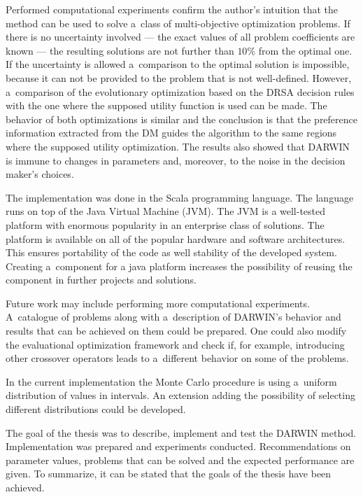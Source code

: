 Performed computational experiments confirm the author's intuition that the
method can be used to solve a~class of multi-objective optimization
problems. If there is no uncertainty involved --- the exact values of all
problem coefficients are known --- the resulting solutions are not further
than $10\%$ from the optimal one. If the uncertainty is allowed a~comparison
to the optimal solution is impossible, because it can not be provided to the
problem that is not well-defined. However, a~comparison of the evolutionary
optimization based on the DRSA decision rules with the one where the supposed
utility function is used can be made. The behavior of both optimizations is
similar and the conclusion is that the preference information extracted from
the DM guides the algorithm to the same regions where the supposed utility
optimization. The results also showed that DARWIN is immune to changes in
parameters and, moreover, to the noise in the decision maker's choices.

The implementation was done in the Scala programming language. The language
runs on top of the Java Virtual Machine (JVM). The JVM is a well-tested
platform with enormous popularity in an enterprise class of solutions. The
platform is available on all of the popular hardware and software
architectures. This ensures portability of the code as well stability of the
developed system. Creating a~component for a java platform increases the
possibility of reusing the component in further projects and solutions.

Future work may include performing more computational experiments. A~catalogue
of problems along with a~description of DARWIN's behavior and results that can
be achieved on them could be prepared. One could also modify the evaluational
optimization framework and check if, for example, introducing other crossover
operators leads to a~different behavior on some of the problems.

In the current implementation the Monte Carlo procedure is using a~uniform
distribution of values in intervals.  An extension adding the possibility of
selecting different distributions could be developed.

The goal of the thesis was to describe, implement and test the DARWIN
method. Implementation was prepared and experiments conducted. Recommendations
on parameter values, problems that can be solved and the expected performance
are given. To summarize, it can be stated that the goals of the thesis have
been achieved.


